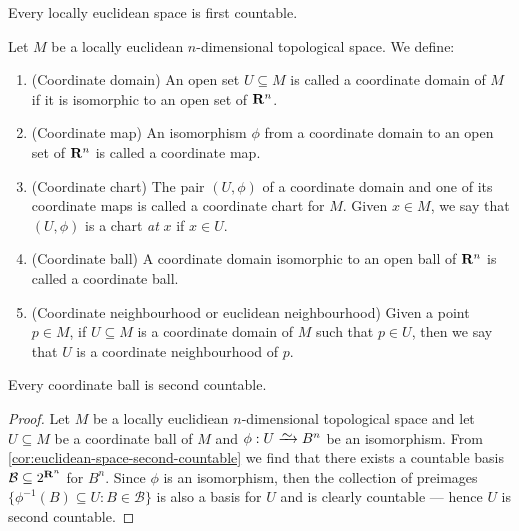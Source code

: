 \begin{proposition}
\label{prop:locally-euclidean-first-countable}
Every locally euclidean space is first countable.
\end{proposition}


\begin{definition}[Miscelaneous]
Let \(M\) be a locally euclidean \(n\)-dimensional topological space. We
define:
\begin{enumerate}[(C1)]
  \item\label{def: coordinate domain}
    (Coordinate domain) An open set \(U \subseteq M\) is called a coordinate
    domain of \(M\) if it is isomorphic to an open set of \(\mathbf{R}^n\).
  \item\label{def: coordinate map}
    (Coordinate map) An isomorphism \(\phi\) from a coordinate domain to an
    open set of \(\mathbf{R}^n\) is called a coordinate map.
  \item\label{def: coordinate chart}
    (Coordinate chart) The pair \((U, \phi)\) of a coordinate domain and one
    of its coordinate maps is called a coordinate chart for \(M\). Given \(x \in
    M\), we say that \((U, \phi)\) is a chart \emph{at} \(x\) if \(x \in U\).
  \item\label{def: coordinate ball}
    (Coordinate ball) A coordinate domain isomorphic to an open ball of
    \(\mathbf{R}^n\) is called a coordinate ball.
  \item\label{def: euclidean neighbourhood}
    (Coordinate neighbourhood or euclidean neighbourhood) Given a point \(p
    \in M\), if \(U \subseteq M\) is a coordinate domain of \(M\) such that
    \(p \in U\), then we say that \(U\) is a coordinate neighbourhood of
    \(p\).
\end{enumerate}
\end{definition}

\begin{proposition}
\label{prop:coordinate-ball-second-countable}
Every coordinate ball is second countable.
\end{proposition}

\begin{proof}
Let \(M\) be a locally euclidiean \(n\)-dimensional topological space and let
\(U \subseteq M\) be a coordinate ball of \(M\) and \(\phi: U \isoto B^n\) be an
isomorphism. From \cref{cor:euclidean-space-second-countable} we find that there
exists a countable basis \(\mathcal B \subseteq 2^{\mathbf{R}^n}\) for \(B^n\). Since
\(\phi\) is an isomorphism, then the collection of preimages \(\{\phi^{-1}(B)
\subseteq U : B \in \mathcal B\}\) is also a basis for \(U\) and is clearly
countable --- hence \(U\) is second countable.
\end{proof}

